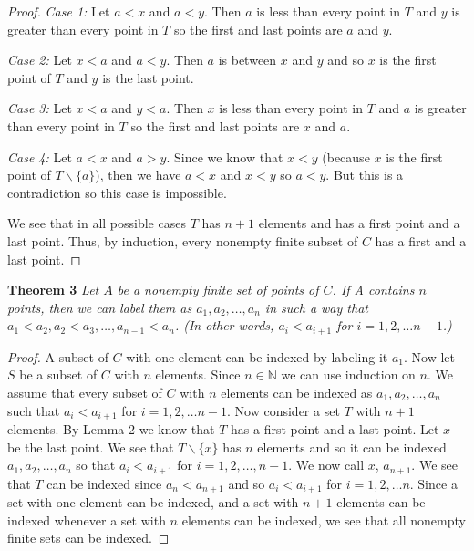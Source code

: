 \documentclass{article}
\begin{document}
\begin{flushleft}
\begin{proof}
\textsl{Case 1:} Let $a<x$ and $a<y$. Then $a$ is less than every point in $T$ and $y$ is greater than every point in $T$ so the first and last points are $a$ and $y$.\newline

\textsl{Case 2:} Let $x<a$ and $a<y$. Then $a$ is between $x$ and $y$ and so $x$ is the first point of $T$ and $y$ is the last point.\newline

\textsl{Case 3:} Let $x<a$ and $y<a$. Then $x$ is less than every point in $T$ and $a$ is greater than every point in $T$ so the first and last points are $x$ and $a$.\newline

\textsl{Case 4:} Let $a<x$ and $a>y$. Since we know that $x<y$ (because $x$ is the first point of $T \backslash \{a\}$), then we have $a<x$ and $x<y$ so $a<y$. But this is a contradiction so this case is impossible.\newline

We see that in all possible cases $T$ has $n+1$ elements and has a first point and a last point. Thus, by induction, every nonempty finite subset of $C$ has a first and a last point.
\end{proof}

\textbf{Theorem 3}
\textsl{Let $A$ be a nonempty finite set of points of $C$. If A contains $n$ points, then we can label them as $a_1, a_2, \dots , a_n$ in such a way that $a_1 < a_2,  a_2 < a_3, \dots ,a_{n-1} < a_n$. (In other words, $a_i < a_{i+1}$ for $i = 1,2, \dots n - 1$.)}
\begin{proof}
A subset of $C$ with one element can be indexed by labeling it $a_1$. Now let $S$ be a subset of $C$ with $n$ elements. Since $n \in \mathbb{N}$ we can use induction on $n$. We assume that every subset of $C$ with $n$ elements can be indexed as $a_1,a_2, \dots ,a_n$ such that $a_i<a_{i+1}$ for $i=1,2,\dots n-1$. Now consider a set $T$ with $n+1$ elements. By Lemma 2 we know that $T$ has a first point and a last point. Let $x$ be the last point. We see that $T\backslash \{x\}$ has $n$ elements and so it can be indexed $a_1,a_2, \dots ,a_n$ so that $a_i<a_{i+1}$ for $i=1,2,\dots ,n-1$. We now call $x$, $a_{n+1}$. We see that $T$ can be indexed since $a_n<a_{n+1}$ and so $a_i<a_{i+1}$ for $i=1,2, \dots n$. Since a set with one element can be indexed, and a set with $n+1$ elements can be indexed whenever a set with $n$ elements can be indexed, we see that all nonempty finite sets can be indexed.
\end{proof}


\end{flushleft}
\end{document}
